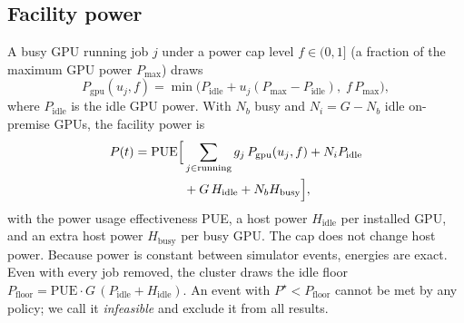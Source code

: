 \subsection{Facility power}
A busy GPU running job $j$ under a power cap level $f\in(0,1]$ (a fraction of the maximum GPU power $P_{\max}$) draws
\begin{equation}
P_{\text{gpu}}(u_j,f)=\min\bigl(P_{\text{idle}}+u_j(P_{\max}-P_{\text{idle}}),\; f\,P_{\max}\bigr),
\end{equation}
where $P_{\text{idle}}$ is the idle GPU power. With $N_b$ busy and $N_i=G-N_b$ idle on-premise GPUs, the facility power is
\begin{equation}
\begin{split}
P(t)=\text{PUE}\Bigl[&\sum_{j\in\text{running}} g_j\,P_{\text{gpu}}(u_j,f)+N_i P_{\text{idle}}\\
&+G\,H_{\text{idle}}+N_b H_{\text{busy}}\Bigr],
\end{split}
\end{equation}
with the power usage effectiveness PUE, a host power $H_{\text{idle}}$ per installed GPU, and an extra host power $H_{\text{busy}}$ per busy GPU. The cap does not change host power. Because power is constant between simulator events, energies are exact.
Even with every job removed, the cluster draws the idle floor $P_{\text{floor}}=\text{PUE}\cdot G\,(P_{\text{idle}}+H_{\text{idle}})$. An event with $P^\star<P_{\text{floor}}$ cannot be met by any policy; we call it \emph{infeasible} and exclude it from all results.

